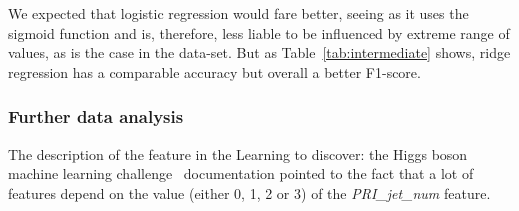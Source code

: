 \documentclass[10pt,conference,compsocconf]{IEEEtran}
\begin{document}
\begin{comment}
\begin{table}[ht]
\centering
\resizebox{\columnwidth}{!}{%
\begin{tabular}{lrrr|r|r|r|}
\cline{5-7}
 &
  \multicolumn{1}{c}{} &
  \multicolumn{1}{l}{} &
  \multicolumn{1}{l|}{} &
  \multicolumn{1}{l|}{Training} &
  \multicolumn{1}{l|}{Validation} &
  \multicolumn{1}{l|}{Testing} \\ \cline{2-7} 
\multicolumn{1}{l|}{} &
  \multicolumn{3}{c|}{Parameters} &
  \multicolumn{1}{l|}{F1-score} &
  \multicolumn{1}{l|}{F1-score} &
  \multicolumn{1}{l|}{F1-score} \\ \hline
\multicolumn{1}{|l|}{Methods} &
  \multicolumn{1}{l|}{Gamma} &
  \multicolumn{1}{l|}{Lambda} &
  \multicolumn{1}{l|}{Max\_iters} &
  \multicolumn{1}{l|}{Accuracy} &
  \multicolumn{1}{l|}{Accuracy} &
  \multicolumn{1}{l|}{Accuracy} \\ \hline
\multicolumn{1}{|l|}{\multirow{2}{*}{\begin{tabular}[c]{@{}l@{}}Logistic \\ regression\end{tabular}}} &
  \multicolumn{1}{r|}{0.5} &
  \multicolumn{1}{r|}{-} &
  10000 &
  71.20\% &
  71.43\% &
  71.20\% \\
\multicolumn{1}{|l|}{} &
  \multicolumn{1}{r|}{} &
  \multicolumn{1}{r|}{} &
   &
  80.10\% &
  81.66\% &
  80.80\% \\ \hline
\multicolumn{1}{|l|}{\multirow{2}{*}{Ridge Regression}} &
  \multicolumn{1}{r|}{-} &
  \multicolumn{1}{r|}{1e-4} &
  - &
  72.97\% &
  72.70\% &
  73.40\% \\
\multicolumn{1}{|l|}{} &
  \multicolumn{1}{r|}{} &
  \multicolumn{1}{r|}{} &
   &
  82.22\% &
  82.00\% &
  80.30\% \\ \hline
\end{tabular}%
}
\caption{Parameters, F1-score and accuracy results after preprocessing the data.}
\label{tab:intermediate}
\end{table}
\end{comment}

We expected that logistic regression would fare better, seeing as it uses 
the sigmoid function and is, therefore, less liable to be influenced by extreme 
range of values, as is the case in the data-set. 
But as Table~\ref{tab:intermediate} shows, ridge regression has a comparable
accuracy but overall a better F1-score.

\subsubsection{Further data analysis}
The description of the feature in the Learning to discover: the Higgs
boson machine learning challenge~\cite{higgsMLdoc} documentation pointed 
to the fact that a lot of features depend on the value (either 0, 1, 2 or 3)
of the \textit{PRI\_jet\_num} feature.
\end{document}
